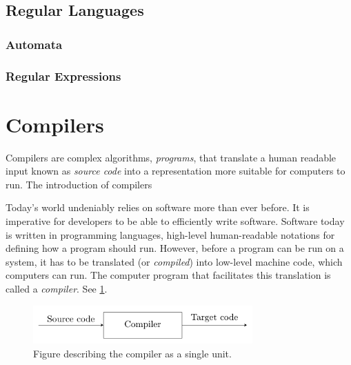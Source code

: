 \subsection{Regular Languages}
\subsubsection{Automata}
\subsubsection{Regular Expressions}



\begin{definition}
\label{def:FSM}
\end{definition}


\begin{definition}
\label{def:regular_exp}
\end{definition}





\section{Compilers}


Compilers are complex algorithms, \emph{programs}, that translate a human readable input known as \emph{source code} into a representation more suitable for computers to run. The introduction of compilers 


Today's world undeniably relies on software more than ever before. It is imperative for developers to be able to efficiently write software. Software today is written in programming languages, high-level human-readable notations for defining how a program should run. However, before a program can be run on a system, it has to be translated (or \emph{compiled}) into low-level machine code, which computers can run. The computer program that facilitates this translation is called a \emph{compiler}. See \cref{fig:compiler}.

\begin{figure}[h]
  \caption{Figure describing the compiler as a single unit.}
  \label{fig:compiler}
  \centering
  \includegraphics[width=0.75\textwidth]{figures/compiler.pdf}
\end{figure}




